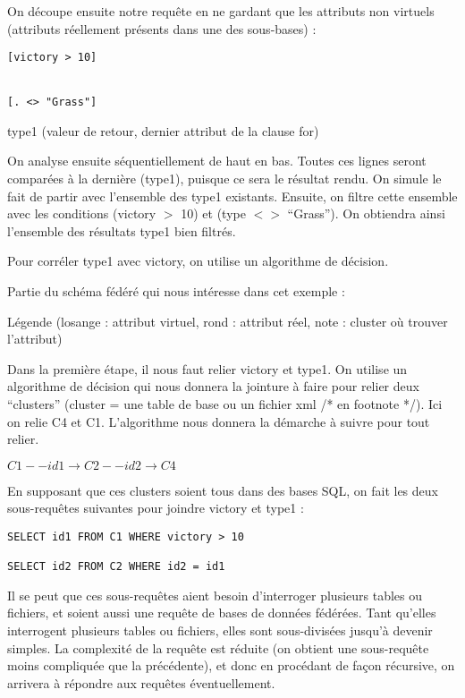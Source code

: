 On découpe ensuite notre requête en ne gardant que les attributs non virtuels (attributs réellement présents dans une des sous-bases) :

\lstset{language=SQL}
\begin{lstlisting}
[victory > 10]


[. <> "Grass"]
\end{lstlisting}

type1 (valeur de retour, dernier attribut de la clause for)

On analyse ensuite séquentiellement de haut en bas. Toutes ces lignes seront comparées à la dernière (type1), puisque ce sera le résultat rendu. On simule le fait de partir avec l’ensemble des type1 existants. Ensuite, on filtre cette ensemble avec les conditions (victory $>$ 10) et (type $<>$ “Grass”). On obtiendra ainsi l’ensemble des résultats type1 bien filtrés.

Pour corréler type1 avec victory, on utilise un algorithme de décision.

Partie du schéma fédéré qui nous intéresse dans cet exemple :

Légende (losange : attribut virtuel, rond : attribut réel, note : cluster où trouver l’attribut)

Dans la première étape, il nous faut relier victory et type1. On utilise un algorithme de décision qui nous donnera la jointure à faire pour relier deux “clusters” (cluster = une table de base ou un fichier xml /* en footnote */). Ici on relie C4 et C1. L’algorithme nous donnera la démarche à suivre pour tout relier.

$C1 --id1 \rightarrow C2 --id2 \rightarrow  C4$

En supposant que ces clusters soient tous dans des bases SQL, on fait les deux sous-requêtes suivantes pour joindre victory et type1 :

\lstset{language=SQL}
\begin{lstlisting}
SELECT id1 FROM C1 WHERE victory > 10

SELECT id2 FROM C2 WHERE id2 = id1
\end{lstlisting}

Il se peut que ces sous-requêtes aient besoin d’interroger plusieurs tables ou fichiers, et soient aussi une requête de bases de données fédérées. Tant qu’elles interrogent plusieurs tables ou fichiers, elles sont sous-divisées jusqu’à devenir simples. La complexité de la requête est réduite (on obtient une sous-requête moins compliquée que la précédente), et donc en procédant de façon récursive, on arrivera à répondre aux requêtes éventuellement.

